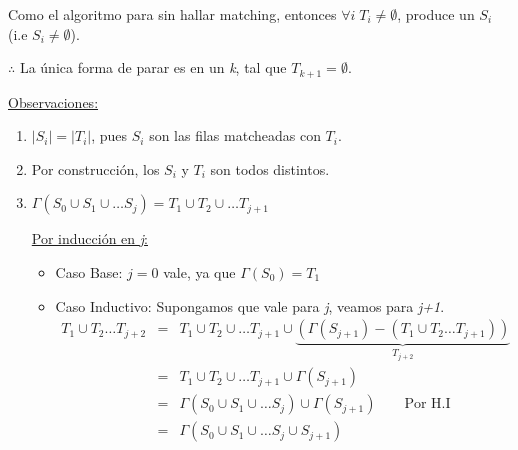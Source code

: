 \documentclass[12pt,a4paper]{report}
\newcounter{neq}
\begin{document}
  			\par Como el algoritmo para sin hallar matching, entonces $\forall i \; T_{i} \neq \emptyset $, produce un $S_{i}$  (i.e $S_{i} \neq \emptyset$).
  			\par $\therefore$ La única forma de parar es en un \textit{k}, tal que $T_{k+1} = \emptyset$.

  			\vspace{5mm}
  			\underline{Observaciones:}
  			\begin{enumerate}
  				\item $\lvert S_{i} \rvert = \lvert T_{i} \rvert$, pues $S_{i}$ son las filas matcheadas con $T_{i}$.
  				\item Por construcción, los $S_{i}$ y $T_{i}$ son todos distintos.
  				\item $\Gamma(S_{0} \cup S_{1} \cup \dotsc S_{j}) = T_{1} \cup T_{2} \cup \dotsc T_{j+1}$
  					\par \underline{Por inducción en \textit{j}:}
  						\begin{itemize}
  							\item Caso Base: $j = 0$ vale, ya que $\Gamma(S_{0}) = T_{1}$
  							\item Caso Inductivo: Supongamos que vale para \textit{j}, veamos para \textit{j+1}.
  								\begin{eqnarray}
  									\nonumber T_{1} \cup T_{2} \dotsc T_{j + 2} &=& T_{1} \cup T_{2} \cup \dotsc T_{j + 1} \cup \underbrace{(\Gamma(S_{j + 1}) - (T_{1} \cup T_{2} \dotsc T_{j + 1}))}_{T_{j + 2}} \\
  									\nonumber &=& T_{1} \cup T_{2} \cup \dotsc T_{j + 1} \cup \Gamma(S_{j + 1}) \\
  									\nonumber &=& \Gamma(S_{0} \cup S_{1} \cup \dotsc S_{j}) \cup \Gamma(S_{j + 1}) \qquad \text{Por H.I} \\
  									\nonumber &=& \Gamma(S_{0} \cup S_{1} \cup \dotsc S_{j} \cup S_{j + 1})
  								\end{eqnarray}
  						\end{itemize}
  			\end{enumerate}
\end{document}
